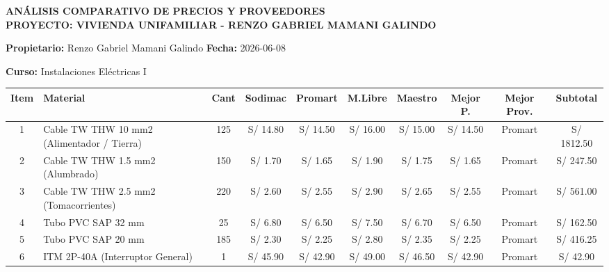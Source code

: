 \documentclass[11pt,a4paper]{article}
\begin{document}
	\begin{landscape}

		\begin{center}
			{\LARGE\bfseries\color{navyblue} ANÁLISIS COMPARATIVO DE PRECIOS Y PROVEEDORES}\\[0.2cm]
			{\large\bfseries PROYECTO: VIVIENDA UNIFAMILIAR - RENZO GABRIEL MAMANI GALINDO}
		\end{center}

		\vspace{0.4cm}

		\textbf{Propietario:} Renzo Gabriel Mamani Galindo
		\hfill
		\textbf{Fecha:} 2026-06-08

		\textbf{Curso:} Instalaciones Eléctricas I

		\vspace{0.4cm}

		\begin{table}[H]
			\centering
			\begin{scriptsize}

				\begin{tabularx}{1.30\textwidth}{c X c c c c c c c c}
					\toprule
					\textbf{Item} &
					\textbf{Material} &
					\textbf{Cant} &
					\textbf{Sodimac} &
					\textbf{Promart} &
					\textbf{M.Libre} &
					\textbf{Maestro} &
					\textbf{Mejor P.} &
					\textbf{Mejor Prov.} &
					\textbf{Subtotal} \\
					\midrule

					1 & Cable TW THW 10 mm2 (Alimentador / Tierra) & 125 &
					S/ 14.80 & S/ 14.50 & S/ 16.00 & S/ 15.00 &
					S/ 14.50 & Promart & S/ 1812.50 \\

					2 & Cable TW THW 1.5 mm2 (Alumbrado) & 150 &
					S/ 1.70 & S/ 1.65 & S/ 1.90 & S/ 1.75 &
					S/ 1.65 & Promart & S/ 247.50 \\

					3 & Cable TW THW 2.5 mm2 (Tomacorrientes) & 220 &
					S/ 2.60 & S/ 2.55 & S/ 2.90 & S/ 2.65 &
					S/ 2.55 & Promart & S/ 561.00 \\

					4 & Tubo PVC SAP 32 mm & 25 &
					S/ 6.80 & S/ 6.50 & S/ 7.50 & S/ 6.70 &
					S/ 6.50 & Promart & S/ 162.50 \\

					5 & Tubo PVC SAP 20 mm & 185 &
					S/ 2.30 & S/ 2.25 & S/ 2.80 & S/ 2.35 &
					S/ 2.25 & Promart & S/ 416.25 \\

					6 & ITM 2P-40A (Interruptor General) & 1 &
					S/ 45.90 & S/ 42.90 & S/ 49.00 & S/ 46.50 &
					S/ 42.90 & Promart & S/ 42.90 \\


\end{tabularx}
\end{scriptsize}
\end{table}
\end{landscape}
\end{document}
